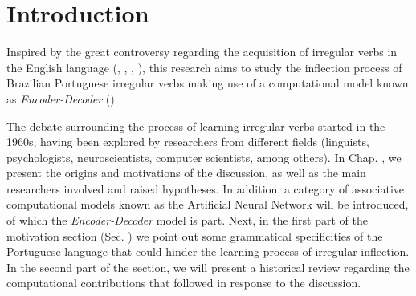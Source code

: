 \chapter*{Introduction}



Inspired by the great controversy regarding the acquisition of irregular verbs in the English language
(\cite{Pinker:1999}, \cite{chomsky:1968}, \cite{Pinker:1988}, \cite{rumelhart:1986}), this research aims to study the inflection process of Brazilian Portuguese irregular verbs making use of a computational model known as \textit{Encoder-Decoder} (\cite{enc-dec:2014}).

The debate surrounding the process of learning irregular verbs started in the 1960s, having been explored by researchers from different fields (linguists, psychologists, neuroscientists, computer scientists, among others). In Chap. , we present the origins and motivations of the discussion, as well as the main researchers involved and raised hypotheses. In addition, a category of associative computational models known as the Artificial Neural Network will be introduced, of which the \textit{Encoder-Decoder} model is part. Next, in the first part of the motivation section (Sec. ) we point out some grammatical specificities of the Portuguese language that could hinder the learning process of irregular inflection. In the second part of the section, we will present a historical review regarding the computational contributions that followed in response to the discussion.

